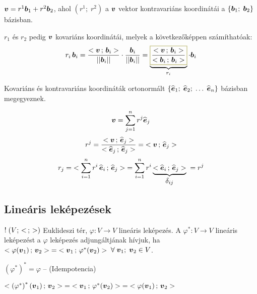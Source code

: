 \documentclass[main.tex]{subfiles}
\begin{document}
\vspace*{1.5em}
$\boldsymbol{v} = r^1 \boldsymbol{b}_1 + r^2 \boldsymbol{b}_2$, ahol
$(r^1 ; \; r^2)$ a $\boldsymbol{v}$ vektor kontravariáns koordinátái
a $\left\{ \boldsymbol{b}_1 ; \; \boldsymbol{b}_2 \right\}$ bázisban.

\vspace*{.5em}
$r_1$ és $r_2$ pedig $\boldsymbol{v}$ kovariáns koordinátái,
melyek a következőképpen számíthatóak:
\begin{equation*}
  r_i \, \rvec{b}_i = \frac{
    \scalar{\rvec{v}}{\rvec{b}_i}
  }{\norma{\rvec{b}_i}} \cdot \frac{
    \rvec{b}_i
  }{\norma{\rvec{b}_i}}
  = \underbrace{\rected{$\displaystyle\frac{
          \scalar{\rvec{v}}{\rvec{b}_i}
        }{\scalar{\rvec{b}_i}{\rvec{b}_i}}$}{yellow}}_{r_i}
  \cdot \rvec{b}_i
\end{equation*}



Kovariáns és kontravariáns koordináták ortonormált
$\left\{ \widehat{\boldsymbol{e}}_1 ; \; \widehat{\boldsymbol{e}}_2 ; \; \dots \; \widehat{\boldsymbol{e}}_n \right\}$
bázisban megegyeznek.


\begin{equation*}
  \boldsymbol{v} = \sum_{j=1}^n r^j \widehat{\boldsymbol{e}}_j
\end{equation*}
\begin{equation*}
  r^j = \dfrac{
    < \boldsymbol{v} \, ; \, \widehat{\boldsymbol{e}}_j >
  }{
    < \widehat{\boldsymbol{e}}_j \, ; \, \widehat{\boldsymbol{e}}_j >
  } = \; < \boldsymbol{v} \, ; \, \widehat{\boldsymbol{e}}_j >
\end{equation*}
\begin{equation*}
  r_j = \; < 
    \sum_{i=1}^n r^i \, \widehat{\boldsymbol{e}}_i
   \, ; \, \widehat{\boldsymbol{e}}_j > \; = \sum_{i=1}^n r^i \underbrace{
    < \widehat{\boldsymbol{e}}_i \, ; \, \widehat{\boldsymbol{e}}_j >
  }_{\displaystyle\delta_{ij}} \; = r^j
\end{equation*}

\subsection{Lineáris leképezések}


$! \; (V; \, <  \, ; \,  >)$ Euklideszi tér,
$\varphi: V \rightarrow V$ lineáris leképezés.
A $\varphi^{*} : V \rightarrow V$ lineáris leképezést
a $\varphi$ leképezés adjungáltjának hívjuk, ha
$< \varphi(\boldsymbol{v}_1) \, ; \, \boldsymbol{v}_2 >
  \; = \; < \boldsymbol{v}_1 \, ; \, \varphi^{*}(\boldsymbol{v}_2) >$
$\forall \; \boldsymbol{v}_1 ;\; \boldsymbol{v}_2 \in V$.

$\left( \varphi^{*} \right)^{*} = \varphi$
\hspace{2mm} – \hspace{2mm} (Idempotencia)

$< \left( \varphi^{*} \right)^{*}(\boldsymbol{v}_1) \, ; \, \boldsymbol{v}_2 >
  \; = \; < \boldsymbol{v}_1 \, ; \, \varphi^{*}(\boldsymbol{v}_2) >
  \; = \; < \varphi(\boldsymbol{v}_1) \, ; \, \boldsymbol{v}_2 >$
\end{document}
